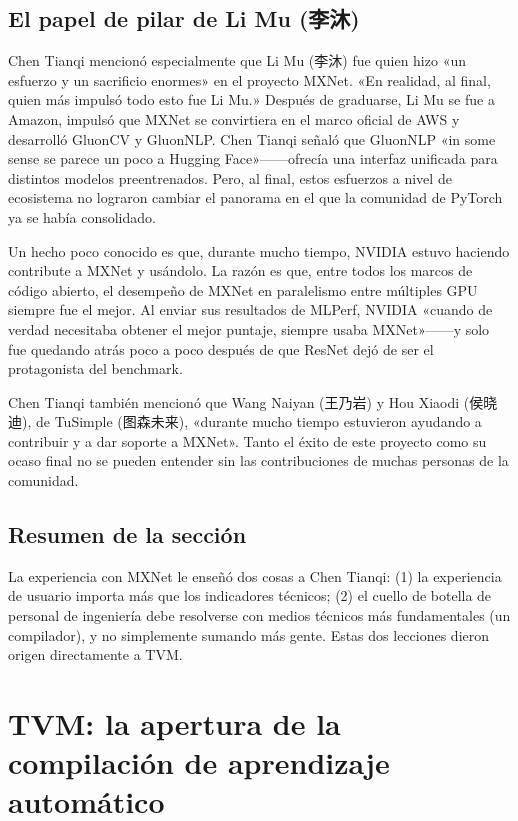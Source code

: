 \documentclass[a4paper]{article}
\begin{document}
\subsection{El papel de pilar de Li Mu (李沐)}

Chen Tianqi mencionó especialmente que Li Mu (李沐) fue quien hizo «un esfuerzo y un sacrificio enormes» en el proyecto MXNet. «En realidad, al final, quien más impulsó todo esto fue Li Mu.» Después de graduarse, Li Mu se fue a Amazon, impulsó que MXNet se convirtiera en el marco oficial de AWS y desarrolló GluonCV y GluonNLP. Chen Tianqi señaló que GluonNLP «in some sense se parece un poco a Hugging Face»------ofrecía una interfaz unificada para distintos modelos preentrenados. Pero, al final, estos esfuerzos a nivel de ecosistema no lograron cambiar el panorama en el que la comunidad de PyTorch ya se había consolidado.

Un hecho poco conocido es que, durante mucho tiempo, NVIDIA estuvo haciendo contribute a MXNet y usándolo. La razón es que, entre todos los marcos de código abierto, el desempeño de MXNet en paralelismo entre múltiples GPU siempre fue el mejor. Al enviar sus resultados de MLPerf, NVIDIA «cuando de verdad necesitaba obtener el mejor puntaje, siempre usaba MXNet»------y solo fue quedando atrás poco a poco después de que ResNet dejó de ser el protagonista del benchmark.

Chen Tianqi también mencionó que Wang Naiyan (王乃岩) y Hou Xiaodi (侯晓迪), de TuSimple (图森未来), «durante mucho tiempo estuvieron ayudando a contribuir y a dar soporte a MXNet». Tanto el éxito de este proyecto como su ocaso final no se pueden entender sin las contribuciones de muchas personas de la comunidad.

\subsection{Resumen de la sección}

La experiencia con MXNet le enseñó dos cosas a Chen Tianqi: (1) la experiencia de usuario importa más que los indicadores técnicos; (2) el cuello de botella de personal de ingeniería debe resolverse con medios técnicos más fundamentales (un compilador), y no simplemente sumando más gente. Estas dos lecciones dieron origen directamente a TVM.
\section{TVM: la apertura de la compilación de aprendizaje automático}
\end{document}
